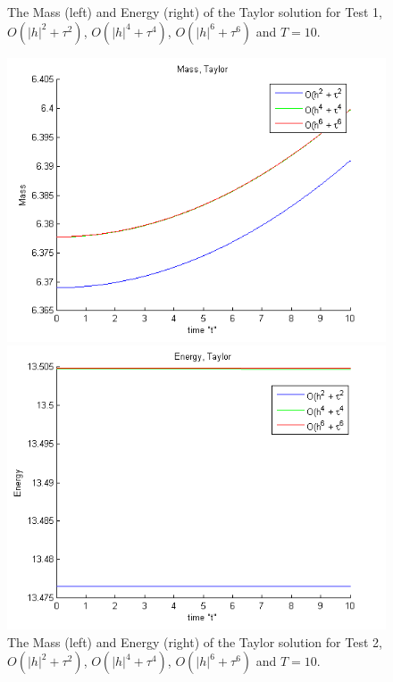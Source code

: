 \documentclass[%
 aip,
cp,  %
 amsmath,amssymb,%
 reprint,%
]{revtex4-2}
\begin{document}
\begin{figure}[ht]
\begin{minipage}[b]{0.33\linewidth}
	\end{minipage}
\caption{The Mass (left) and Energy (right) of the Taylor solution for Test 1, $O(|h|^2 + \tau^2)$, $O(|h|^4 + \tau^4)$, $O(|h|^6 + \tau^6)$ and $T = 10$.}
\label{Test1TEn}
\end{figure}
\begin{figure}[ht]\vspace{0.4cm}
	\begin{minipage}[b]{0.33\linewidth}
		 \includegraphics[width=\linewidth]{figures/Mass_bt3_c045_h005_x3O.png}
	\end{minipage}	
	\begin{minipage}[b]{0.33\linewidth}
		\includegraphics[width=\linewidth]{figures/Energy_bt1_c090_h010_x3O.png}
		
	\end{minipage}
\caption{The Mass (left) and Energy (right) of the Taylor solution for Test 2, $O(|h|^2 + \tau^2)$, $O(|h|^4 + \tau^4)$, $O(|h|^6 + \tau^6)$ and $T = 10$.}
\label{Test2TEn}
\end{figure}
\end{document}
